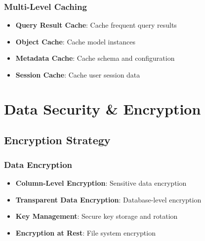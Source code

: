 \subsubsection{Multi-Level Caching}
\begin{itemize}
    \item \textbf{Query Result Cache}: Cache frequent query results
    \item \textbf{Object Cache}: Cache model instances
    \item \textbf{Metadata Cache}: Cache schema and configuration
    \item \textbf{Session Cache}: Cache user session data
\end{itemize}

\section{Data Security \& Encryption}

\subsection{Encryption Strategy}

\subsubsection{Data Encryption}
\begin{itemize}
    \item \textbf{Column-Level Encryption}: Sensitive data encryption
    \item \textbf{Transparent Data Encryption}: Database-level encryption
    \item \textbf{Key Management}: Secure key storage and rotation
    \item \textbf{Encryption at Rest}: File system encryption
\end{itemize}

